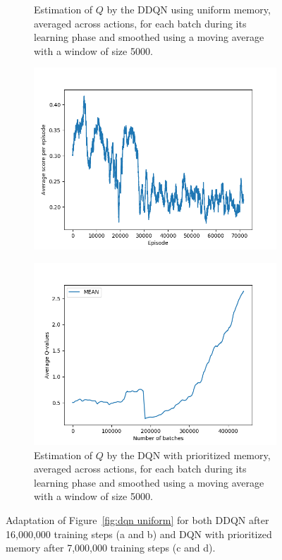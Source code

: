 \documentclass[letterpaper]{article}
\begin{document}
\begin{figure}[!t]
\begin{subfigure}{.47\textwidth}
		\caption{Estimation of $Q$ by the DDQN using uniform memory, averaged across actions, for each batch during its learning phase and smoothed using a moving average
		with a window of size 5000.}
	\end{subfigure}
	\begin{subfigure}{.47\textwidth}
		\vspace{-.15cm}
		\includegraphics[width=\textwidth]{figures/dqn_prioritized_e_scores}
	\end{subfigure}
	\hfill
	\begin{subfigure}{.47\textwidth}
		\vspace{-.15cm}
		\includegraphics[width=\textwidth]{figures/dqn_prioritized_q_values}
		\caption{Estimation of $Q$ by the DQN with prioritized memory, averaged across actions, for each batch during its learning phase and smoothed using a moving average
		with a window of size 5000.}
	\end{subfigure}
	\caption{Adaptation of Figure~\ref{fig:dqn uniform} for both DDQN after 16,000,000 training steps (a and b) and DQN with prioritized memory after 7,000,000
	training steps (c and d).\label{fig:DDQN + DQNP}}
\end{figure}
\end{document}
